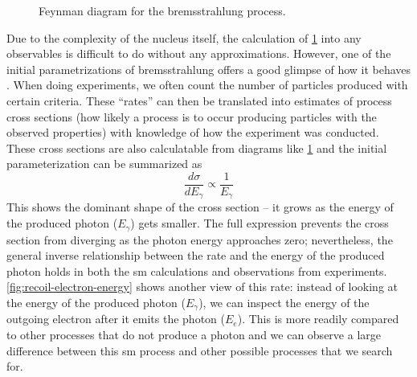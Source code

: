 \begin{figure}
  \centering
  \caption{
    Feynman diagram for the bremsstrahlung process.
  }
  \label{fig:brem-feynman}
\end{figure}

Due to the complexity of the nucleus itself, the calculation of \cref{fig:brem-feynman} into
any observables is difficult to do without any approximations. However, one of the initial parametrizations of
bremsstrahlung offers a good glimpse of how it behaves \cite{bethe-heitler-1934}.
When doing experiments, we often count the number of particles produced with certain criteria.
These ``rates'' can then be translated into estimates of process cross sections (how likely a process
is to occur producing particles with the observed properties) with knowledge of
how the experiment was conducted. These cross sections are also calculatable from diagrams like
\cref{fig:brem-feynman} and the initial parameterization can be summarized as
\[
  \frac{d\sigma}{d E_\gamma} \propto \frac{1}{E_\gamma}
\]
This shows the dominant shape of the cross section
-- it grows as the energy of the produced photon
(\(E_\gamma\)) gets smaller. The full expression prevents the cross section from diverging as the
photon energy approaches zero; nevertheless, the general inverse relationship between the rate and
the energy of the produced photon holds in both the \ac{sm} calculations and observations from
experiments.
\cref{fig:recoil-electron-energy} shows another view of this rate: instead of looking at the
energy of the produced photon ($E_\gamma$), we can inspect the energy of the outgoing electron after
it emits the photon ($E_e$). This is more readily compared to other processes that do not
produce a photon and we can observe a large difference between this \ac{sm} process and other
possible processes that we search for.

